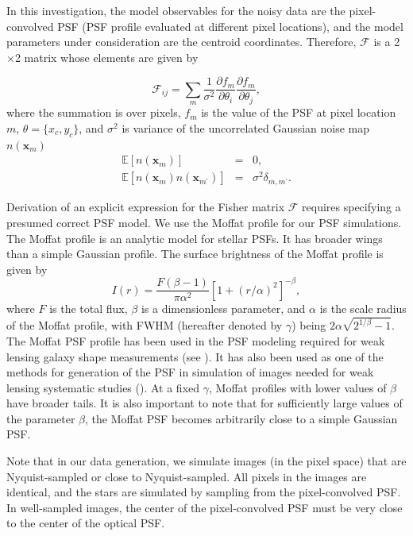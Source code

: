 \documentclass[onecolumn]{aastex61}
\newcommand{\beq}{\begin{equation}}
\newcommand{\eeq}{\end{equation}}
\newcommand{\todo}[1]{{\textcolor{dred}{ #1}}}
\begin{document}
In this investigation, the model observables for the noisy data are the pixel-convolved PSF (PSF profile evaluated at different pixel locations), and  
the model parameters under consideration are the centroid coordinates. Therefore, $\mathcal{F}$
is a 2$\times$2 matrix whose elements are given by

\beq
  \mathcal{F}_{ij} = \sum_{m}\frac{1}{\sigma^{2}}
                \frac{\partial f_{m}}{\partial \theta_{i}}\frac{\partial f_{m}}{\partial \theta_{j}},
\label{fish}
\eeq
where the summation is over pixels, $f_{m}$ is the value of the PSF at pixel location $m$,
$\theta=\{x_{c},y_{c}\}$, and $\sigma^{2}$ is variance of the uncorrelated Gaussian noise map $n(\mathbf{x}_{m})$
\begin{eqnarray}
\mathbb{E}[n(\mathbf{x}_{m})] &=& 0, \\
\mathbb{E}[n(\mathbf{x}_{m})n(\mathbf{x}_{m^{\prime}})] &=& \sigma^{2}\delta_{m,m^{\prime}}. 
\end{eqnarray}

Derivation of an explicit expression for the Fisher matrix $\mathcal{F}$ requires 
specifying a presumed correct PSF model.
We use the Moffat profile \citep{moffat} for our PSF simulations. 
The Moffat profile is an analytic model for stellar PSFs. It has broader wings than
a simple Gaussian profile. The surface brightness of the Moffat profile is given by
\beq
I(r) = \frac{F(\beta -1)}{\pi \alpha^{2}}[1+(r/\alpha)^{2}]^{-\beta},
\label{mof}
\eeq
where $F$ is the total flux, $\beta$ is a dimensionless parameter, and $\alpha$ is
the scale radius of the Moffat profile, with FWHM (hereafter denoted by $\gamma$)
being $2\alpha\sqrt{2^{1/\beta}-1}$. \todo{The Moffat PSF profile has been used in the PSF modeling required for weak lensing galaxy shape measurements (see \citealt{im3shape,im3shape_code}). It has also been used as one of the methods for generation of the PSF in simulation of images needed for weak lensing systematic studies (\citealt{galsim}).}
At a fixed $\gamma$, Moffat profiles with lower values
of $\beta$ have broader tails. It is also important to note that for sufficiently large values of the 
parameter $\beta$, the Moffat PSF becomes arbitrarily close to a simple Gaussian PSF. 

\todo{Note that in our data generation, we simulate images (in the pixel space) that are Nyquist-sampled or close to Nyquist-sampled. All pixels in the images are identical, and the stars are simulated 
by sampling from the pixel-convolved PSF. In well-sampled images, the center of 
the pixel-convolved PSF must be very close to the center of the optical PSF.}
 
\end{document}
